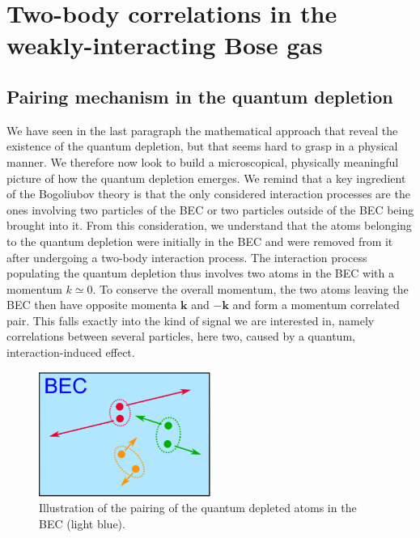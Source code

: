 \section{Two-body correlations in the weakly-interacting Bose gas}

\subsection{Pairing mechanism in the quantum depletion}

We have seen in the last paragraph the mathematical approach that reveal the existence of the quantum depletion, but that seems hard to grasp in a physical manner. We therefore now look to build a microscopical, physically meaningful picture of how the quantum depletion emerges. We remind that a key ingredient of the Bogoliubov theory is that the only considered interaction processes are the ones involving two particles of the BEC or two particles outside of the BEC being brought into it. From this consideration, we understand that the atoms belonging to the quantum depletion were initially in the BEC and were removed from it after undergoing a two-body interaction process. The interaction process populating the quantum depletion thus involves two atoms in the BEC with a momentum $k \simeq 0$. To conserve the overall momentum, the two atoms leaving the BEC then have opposite momenta $\bm{k}$ and $-\bm{k}$ and form a momentum correlated pair. This falls exactly into the kind of signal we are interested in, namely correlations between several particles, here two, caused by a quantum, interaction-induced effect.

\begin{figure}
    \centering
    \includegraphics[width=0.5\textwidth]{Fig/Chapter1/pairs.png}
    \caption{Illustration of the \kmk pairing of the quantum depleted atoms in the BEC (light blue).}
    \label{fig:bec_pairs}
\end{figure}

